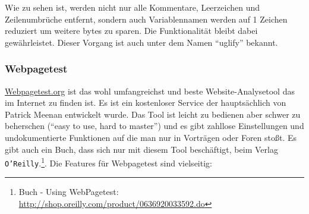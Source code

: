 			Wie zu sehen ist, werden nicht nur alle Kommentare, Leerzeichen und Zeilenumbrüche entfernt, sondern auch Variablennamen werden auf 1 Zeichen reduziert um weitere bytes zu sparen. Die Funktionalität bleibt dabei gewährleistet. Dieser Vorgang ist auch unter dem Namen "`uglify"' bekannt.
		

		\subsubsection{Webpagetest} %
		\label{ssub:webpagetest}
			\url{Webpagetest.org} ist das wohl umfangreichst und beste Website-Analysetool das im Internet zu finden ist. Es ist ein kostenloser Service der hauptsächlich von Patrick Meenan entwickelt wurde. Das Tool ist leicht zu bedienen aber schwer zu beherschen ("`easy to use, hard to master"') und es gibt zahllose Einstellungen und undokumentierte Funktionen auf die man nur in Vorträgen oder Foren stoßt. Es gibt auch ein Buch, dass sich nur mit diesem Tool beschäftigt, beim Verlag \texttt{O'Reilly}.\footnote{Buch - Using WebPagetest: \url{http://shop.oreilly.com/product/0636920033592.do}}.	Die Features für Webpagetest sind vielseitig:

